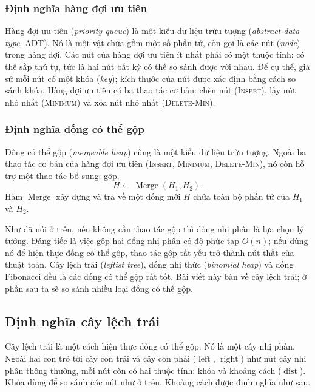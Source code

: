 \documentclass[11pt]{article}
\begin{document}
\subsubsection{Định nghĩa hàng đợi ưu tiên}

Hàng đợi ưu tiên (\emph{priority queue}) là một kiểu dữ liệu trừu tượng
(\emph{abstract data type}, ADT). Nó là một vật chứa gồm một số phần tử, còn gọi
là các nút (\emph{node}) trong hàng đợi. Các nút của hàng đợi ưu tiên ít nhất
phải có một thuộc tính: có thể sắp thứ tự, tức là hai nút bất kỳ có thể so sánh
được với nhau. Để cụ thể, giả sử mỗi nút có một khóa (\emph{key}); kích thước
của nút được xác định bằng cách so sánh khóa. Hàng đợi ưu tiên có ba thao tác
cơ bản: chèn nút (\textsc{Insert}), lấy nút nhỏ nhất (\textsc{Minimum}) và xóa
nút nhỏ nhất (\textsc{Delete-Min}).

\subsubsection{Định nghĩa đống có thể gộp}

Đống có thể gộp (\emph{mergeable heap}) cũng là một kiểu dữ liệu trừu tượng. Ngoài
ba thao tác cơ bản của hàng đợi ưu tiên
(\textsc{Insert}, \textsc{Minimum}, \textsc{Delete-Min}), nó còn hỗ trợ một thao tác
bổ sung: gộp.
\[
  H \gets \operatorname{Merge}(H_1,H_2).
\]
Hàm \(\operatorname{Merge}\) xây dựng và trả về một đống mới \(H\) chứa toàn bộ
phần tử của \(H_1\) và \(H_2\).

Như đã nói ở trên, nếu không cần thao tác gộp thì đống nhị phân là lựa chọn lý
tưởng. Đáng tiếc là việc gộp hai đống nhị phân có độ phức tạp \(O(n)\); nếu dùng
nó để hiện thực đống có thể gộp, thao tác gộp tất yếu trở thành nút thắt của
thuật toán. Cây lệch trái (\emph{leftist tree}), đống nhị thức
(\emph{binomial heap}) và đống Fibonacci đều là các đống có thể gộp rất tốt. Bài
viết này bàn về cây lệch trái; ở phần sau ta sẽ so sánh nhiều loại đống có thể
gộp.

\subsection{Định nghĩa cây lệch trái}

Cây lệch trái là một cách hiện thực đống có thể gộp. Nó là một cây nhị phân.
Ngoài hai con trỏ tới cây con trái và cây con phải (\(\operatorname{left}\),
\(\operatorname{right}\)) như nút cây nhị phân thông thường, mỗi nút còn có hai
thuộc tính: khóa và khoảng cách (\(\operatorname{dist}\)). Khóa dùng để so sánh
các nút như ở trên. Khoảng cách được định nghĩa như sau.
\end{document}
